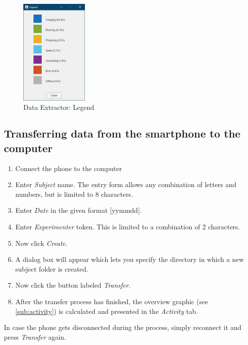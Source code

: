 \documentclass[11pt,a4paper,titlepage]{article}
\begin{document}
\begin{figure}
	\centering
		\includegraphics[width=0.30\textwidth]{images/Legend.PNG}
	\caption{Data Extractor: Legend}
	\label{fig:Legend}
\end{figure}




\subsection{Transferring data from the smartphone to the computer}\label{sub:transfer}


\begin{enumerate}
	\item Connect the phone to the computer
	\item Enter \textit{Subject} name. The entry form allows any combination of letters and numbers, but is limited to 8 characters.
	\item Enter \textit{Date} in the given format [yymmdd].
	\item Enter \textit{Experimenter} token. This is limited to a combination of 2 characters.
	\item Now click \textit{Create}.
	\item A dialog box will appear which lets you specify the directory in which a new subject folder is created.
	\item Now click the button labeled \textit{Transfer}.
	\item After the transfer process has finished, the overview graphic (see \ref{sub:activity}) is calculated and presented in the \textit{Activity} tab.
\end{enumerate}

In case the phone gets disconnected during the process, simply reconnect it and press \textit{Transfer} again.



\clearpage
\end{document}
